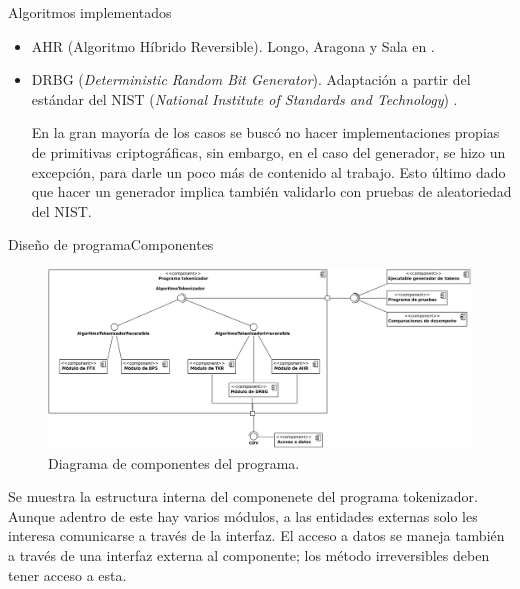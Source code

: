 \begin{frame}{Algoritmos implementados}
\begin{itemize}
\begin{itemize}
        \item<6-> AHR (Algoritmo Híbrido Reversible). Longo, Aragona y Sala
          en \cite{aragona}.

        \item<7-> DRBG (\textit{Deterministic Random Bit Generator}). Adaptación
          a partir del estándar del NIST (\textit{National Institute of Standards
          and Technology}) \cite{nist_aleatorios}.

          {
            En la gran mayoría de los casos se buscó no hacer implementaciones
            propias de primitivas criptográficas, sin embargo, en el caso del
            generador, se hizo un excepción, para darle un poco más de contenido
            al trabajo. Esto último dado que hacer un generador implica también
            validarlo con pruebas de aleatoriedad del NIST.
          }

      \end{itemize}
  \end{itemize}
\end{frame}

\begin{frame}{Diseño de programa}{Componentes}

  \begin{figure}[H]
    \begin{center}
      \includegraphics[width=1.0\linewidth]
        {../../../diagramas_comunes/disenio/componentes.png}
      \caption{Diagrama de componentes del programa.}
    \end{center}
  \end{figure}

  \note
  {
    Se muestra la estructura interna del componenete del programa
    tokenizador. Aunque adentro de este hay varios módulos, a las entidades
    externas solo les interesa comunicarse a través de la interfaz. El acceso
    a datos se maneja también a través de una interfaz externa al componente;
    los método irreversibles deben tener acceso a esta.
  }

\end{frame}
